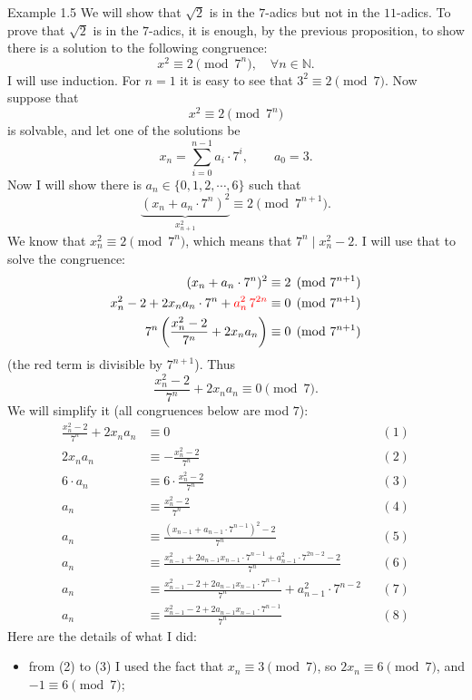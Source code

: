\documentclass[11pt]{article}
\begin{document}
\begin{exbox}{Example 1.5}
We will show that $\sqrt{2}$ is in the $7$-adics but not in the $11$-adics. To prove that $\sqrt{2}$ is in the $7$-adics, it is enough, by the previous proposition, to show there is a solution to the following congruence:
\[
x^2 \equiv 2 \pmod{7^n}, \quad \forall n \in \mathbb{N}.
\]
I will use induction. For $n = 1$ it is easy to see that $3^2 \equiv 2 \pmod 7$. Now suppose that
\[
x^2 \equiv 2 \pmod{7^n}
\]
is solvable, and let one of the solutions be
\[
x_n = \sum_{i=0}^{n-1} a_i \cdot 7^{i}, \qquad a_0 = 3 .
\]
Now I will show there is $a_n \in \{0, 1, 2, \cdots, 6\}$ such that
\[
\underbrace{(x_n + a_n \cdot 7^{n})^2}_{x_{n+1}^2} \equiv 2 \pmod{7^{n+1}} .
\]
We know that $x_n^2 \equiv 2 \pmod{7^n}$, which means that $7^n \mid x_n^2 - 2$. I will use that to solve the congruence:
\[
\begin{aligned}
(x_n + a_n \cdot 7^{n})^2 &\equiv 2 \pmod{7^{n+1}} \\
x_n^2 - 2 + 2x_n a_n \cdot 7^{n} + {\color{red} a_n^2\, 7^{2n}} &\equiv 0 \pmod{7^{n+1}} \\
7^n \left( \frac{x_n^2 - 2}{7^n} + 2x_n a_n \right) &\equiv 0 \pmod{7^{n+1}}
\end{aligned}
\]
(the red term is divisible by $7^{n+1}$). Thus
\[
\frac{x_n^2 - 2}{7^n} + 2x_n a_n \equiv 0 \pmod 7 .
\]
We will simplify it (all congruences below are mod $7$):
\[
\begin{aligned}
\frac{x_n^2 - 2}{7^n} + 2x_n a_n &\equiv 0 && (1) \\
2x_n a_n &\equiv -\frac{x_n^2 - 2}{7^n} && (2) \\
6\cdot a_n &\equiv 6\cdot \frac{x_n^2 - 2}{7^n} && (3) \\
a_n &\equiv \frac{x_n^2 - 2}{7^n} && (4) \\
a_n &\equiv \frac{(x_{n-1} + a_{n-1}\cdot 7^{n-1})^2 - 2}{7^n} && (5) \\
a_n &\equiv \frac{x_{n-1}^2 + 2a_{n-1}x_{n-1}\cdot 7^{n-1} + a_{n-1}^2\cdot 7^{2n-2} - 2}{7^n} && (6) \\
a_n &\equiv \frac{x_{n-1}^2 - 2 + 2a_{n-1}x_{n-1}\cdot 7^{n-1}}{7^n} + a_{n-1}^2\cdot 7^{n-2} && (7) \\
a_n &\equiv \frac{x_{n-1}^2 - 2 + 2a_{n-1}x_{n-1}\cdot 7^{n-1}}{7^n} && (8)
\end{aligned}
\]
Here are the details of what I did:
\begin{itemize}
\item from (2) to (3) I used the fact that $x_n \equiv 3 \pmod 7$, so $2x_n \equiv 6 \pmod 7$, and $-1 \equiv 6 \pmod 7$;

\end{itemize}
\end{exbox}
\end{document}
